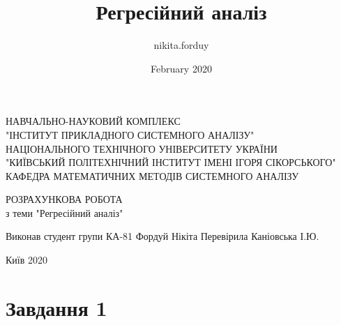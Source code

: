 \documentclass{article}
\title{Регресійний аналіз}
\author{nikita.forduy }
\date{February 2020}
\begin{document}
  
  \pagestyle{empty}
  \newtheorem{theorem}{Теорема}

  \begin{titlepage}
      \thispagestyle{empty}
      \setlength{\parindent}{0ex} %
      
      \begin{center}
        НАВЧАЛЬНО-НАУКОВИЙ КОМПЛЕКС \\
        "ІНСТИТУТ ПРИКЛАДНОГО СИСТЕМНОГО АНАЛІЗУ" \\
        НАЦІОНАЛЬНОГО ТЕХНІЧНОГО УНІВЕРСИТЕТУ УКРАЇНИ \\
        "КИЇВСЬКИЙ ПОЛІТЕХНІЧНИЙ ІНСТИТУТ ІМЕНІ ІГОРЯ СІКОРСЬКОГО" \\
        \smallskip
        КАФЕДРА МАТЕМАТИЧНИХ МЕТОДІВ СИСТЕМНОГО АНАЛІЗУ \\
      \end{center}
      \vspace{60mm}
      
      \begin{center}
        РОЗРАХУНКОВА РОБОТА \\
        з теми "Регресійний аналіз" \\
        
      \end{center}
      
      \vspace{30mm}
      

      \hfill
      \begin{minipage}{.4\linewidth}
        \begin{flushright}
          Виконав студент групи КА-81
          Фордуй Нікіта
          \smallskip
          Перевірила Каніовська І.Ю.
        \end{flushright}
      \end{minipage}
      
      \vspace{10mm}

      \vfill
      \begin{center}
        Київ 2020
      \end{center}
      
      \setlength{\parindent}{5ex} %
  \end{titlepage}

  \tableofcontents

  \pagestyle{plain}

  \newpage
  \section{Завдання 1}
\end{document}
